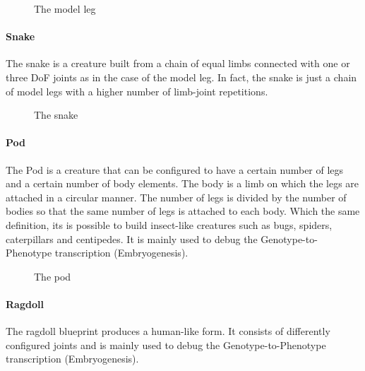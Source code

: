 \documentclass[main]{subfiles}
\begin{document}
\begin{figure}[!h]
\centering
{}
\caption{The model leg}
\label{figure:model-leg}
\end{figure}

\paragraph{Snake}

The snake is a creature built from a chain of equal limbs connected with one or three DoF joints as in the case of the model leg. In fact, the snake is just a chain of model legs with a higher number of limb-joint repetitions.

\begin{figure}[!h]
\centering
{}
\caption{The snake}
\label{figure:snake}
\end{figure}


\paragraph{Pod}

The Pod is a creature that can be configured to have a certain number of legs and a certain number of body elements. The body is a limb on which the legs are attached in a circular manner. The number of legs is divided by the number of bodies so that the same number of legs is attached to each body. Which the same definition, its is possible to build insect-like creatures such as bugs, spiders, caterpillars and centipedes. It is mainly used to debug the Genotype-to-Phenotype transcription (Embryogenesis).

\begin{figure}[!h]
\centering
{}
\caption{The pod}
\label{figure:pod}
\end{figure}


\paragraph{Ragdoll}

The ragdoll blueprint produces a human-like form. It consists of differently configured joints and is mainly used to debug the Genotype-to-Phenotype transcription (Embryogenesis).
\end{document}
